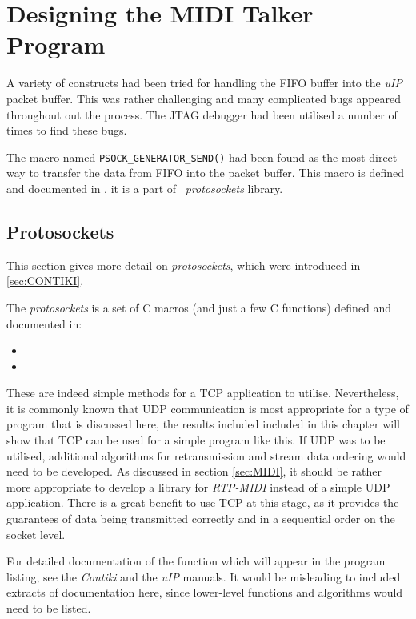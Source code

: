 \section{Designing the MIDI Talker Program}

  A variety of constructs had been tried for handling the
 FIFO  buffer into the \emph{uIP} packet buffer. This was
 rather challenging and many complicated bugs appeared
 throughout out the process. The JTAG debugger had been
 utilised a number of times to find these bugs.

  The macro named \texttt{PSOCK\_GENERATOR\_SEND()} had
 been found as the most direct way to transfer the data
 from FIFO into the packet buffer. This macro is defined
 and documented in , it is a part
 of \Contiki\ \emph{protosockets} library.

\subsection{Protosockets}

  This section gives more detail on \emph{protosockets},
 which were introduced in \ref{sec:CONTIKI}.

  The \emph{protosockets}  is a set of C macros (and just
 a few C functions) defined and documented in:
 \begin{itemize}	
	\item{}
	\item{}
 \end{itemize}

 These are indeed simple methods for a TCP application to
 utilise. Nevertheless, it is commonly known that UDP
 communication is most appropriate for a type of program
 that is discussed here, the results included included in
 this chapter will show that TCP can be used for a simple
 program like this. If UDP was to be utilised, additional
 algorithms for retransmission and stream data ordering
 would need to be developed. As discussed in section
 \ref{sec:MIDI}, it should be rather more appropriate to
 develop a library for \emph{RTP-MIDI} instead of a simple
 UDP application. There is a great benefit to use TCP at
 this stage, as it provides the guarantees of data being
 transmitted correctly and in a sequential order on the
 socket level.

 For detailed documentation of the function which will
 appear in the program listing, see the \emph{Contiki}
 \cite{contiki:docs} and the \emph{uIP} \cite{uip:docs}
 manuals. It would be misleading to included extracts
 of documentation here, since lower-level functions
 and algorithms would need to be listed.

